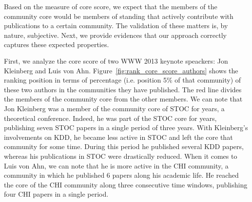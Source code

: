 Based on the measure of core score, we expect that the members of the community core would be members of standing that actively contribute with publications to a certain community.
The validation of these matters is, by nature, subjective.  Next, we provide evidences that our approach correctly captures these expected properties.

First, we analyze the core score of two WWW 2013 keynote speackers: Jon Kleinberg and Luis von Ahn.  Figure~\ref{fig:rank_core_score_authors} shows the ranking position in terms of
percentage (i.e. position 5\% of that community) of these two authors in the communities they have published. The red line divides the members of the community core from the other
members. We can note that Jon Kleinberg was a member of the community core of STOC for years, a theoretical conference. Indeed, he was part of the STOC core for  years,
publishing seven STOC papers in a single period of three years. With Kleinberg's involvements on KDD, he became less active in STOC and left the core that community for some time.
During this period he published several KDD papers, whereas his publications in STOC were drastically reduced.  When it comes to Luis von Ahn, we can note that he is more active in
the CHI community, a community in which he published 6 papers along his academic life. He reached the core of the CHI community along three consecutive time windows,
publishing four CHI papers in a single period.



